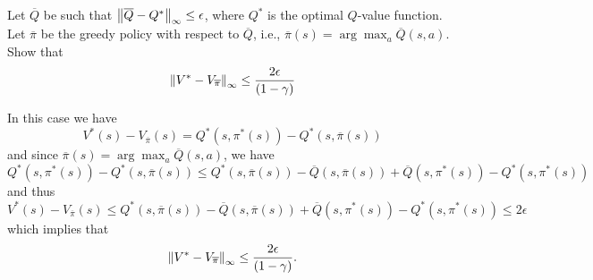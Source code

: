 \documentclass{article}
\begin{document}
\begin{homeworkProblem}

    Let $\overline{Q}$ be such that $\left\lVert\overline{Q} - Q^*\right\rVert_\infty \leq \epsilon$, where $Q^*$ is the optimal $Q$-value function. Let $\overline{\pi}$ be the greedy policy with respect to $\overline{Q}$, i.e., $\overline{\pi}(s) = \arg\max_{a} \overline{Q}(s,a)$. Show that
    \[
        \left\lVert V^* - V_{\overline{\pi}}\right\rVert_\infty \leq \frac{2\epsilon}{(1-\gamma)}
    \]
    \solution

    In this case we have
    \[
        V^*(s) - V_{\overline{\pi}}(s) = Q^*(s, \pi^*(s)) - Q^*(s, \overline{\pi}(s))
    \]
    and since $\overline{\pi}(s) = \arg\max_{a} \overline{Q}(s,a)$, we have
    \[
        Q^*(s, \pi^*(s)) - Q^*(s, \overline{\pi}(s)) \leq Q^*(s, \overline{\pi}(s)) - \overline{Q}(s, \overline{\pi}(s)) + \overline{Q}(s, \pi^*(s)) - Q^*(s, \pi^*(s))
    \]
    and thus
    \[
        V^*(s) - V_{\overline{\pi}}(s) \leq Q^*(s, \overline{\pi}(s)) - \overline{Q}(s, \overline{\pi}(s)) + \overline{Q}(s, \pi^*(s)) - Q^*(s, \pi^*(s)) \leq 2\epsilon
    \]
    which implies that
    \[
        \left\lVert V^* - V_{\overline{\pi}}\right\rVert_\infty \leq \frac{2\epsilon}{(1-\gamma)}.
    \]
\end{homeworkProblem}
\end{document}
